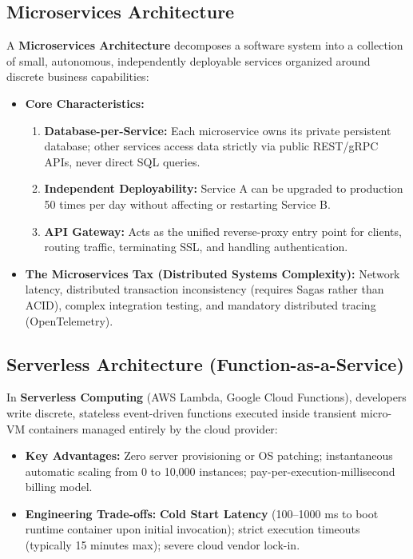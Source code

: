 \subsection{Microservices Architecture}
A \textbf{Microservices Architecture} decomposes a software system into a collection of small, autonomous, independently deployable services organized around discrete business capabilities:
\begin{itemize}
    \item \textbf{Core Characteristics:}
    \begin{enumerate}
        \item \textbf{Database-per-Service:} Each microservice owns its private persistent database; other services access data strictly via public REST/gRPC APIs, never direct SQL queries.
        \item \textbf{Independent Deployability:} Service A can be upgraded to production 50 times per day without affecting or restarting Service B.
        \item \textbf{API Gateway:} Acts as the unified reverse-proxy entry point for clients, routing traffic, terminating SSL, and handling authentication.
    \end{enumerate}
    \item \textbf{The Microservices Tax (Distributed Systems Complexity):} Network latency, distributed transaction inconsistency (requires Sagas rather than ACID), complex integration testing, and mandatory distributed tracing (OpenTelemetry).
\end{itemize}

\subsection{Serverless Architecture (Function-as-a-Service)}
In \textbf{Serverless Computing} (AWS Lambda, Google Cloud Functions), developers write discrete, stateless event-driven functions executed inside transient micro-VM containers managed entirely by the cloud provider:
\begin{itemize}
    \item \textbf{Key Advantages:} Zero server provisioning or OS patching; instantaneous automatic scaling from 0 to 10,000 instances; pay-per-execution-millisecond billing model.
    \item \textbf{Engineering Trade-offs:} \textbf{Cold Start Latency} (100--1000 ms to boot runtime container upon initial invocation); strict execution timeouts (typically 15 minutes max); severe cloud vendor lock-in.
\end{itemize}

